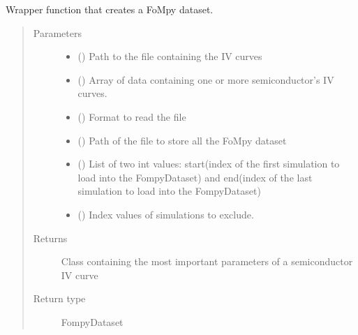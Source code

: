 \documentclass[letterpaper,10pt,english,openany, oneside]{sphinxmanual}
\begin{document}
\begin{fulllineitems}
\label{\detokenize{index:fompy.wrappers.dataset}}
Wrapper function that creates a FoMpy dataset.
\begin{quote}\begin{description}
\item[{Parameters}] \leavevmode\begin{itemize}
\item {} 
 () \textendash{} Path to the file containing the IV curves

\item {} 
 () \textendash{} Array of data containing one or more semiconductor’s IV curves.

\item {} 
 () \textendash{} Format to read the file

\item {} 
 () \textendash{} Path of the file to store all the FoMpy dataset

\item {} 
 () \textendash{} List of two int values: start(index of the first simulation to load into the FompyDataset)
and end(index of the last simulation to load into the FompyDataset)

\item {} 
 () \textendash{} Index values of simulations to exclude.

\end{itemize}

\item[{Returns}] \leavevmode
Class containing the most important parameters of a semiconductor IV curve

\item[{Return type}] \leavevmode
FompyDataset

\end{description}\end{quote}

\end{fulllineitems}
\end{document}
